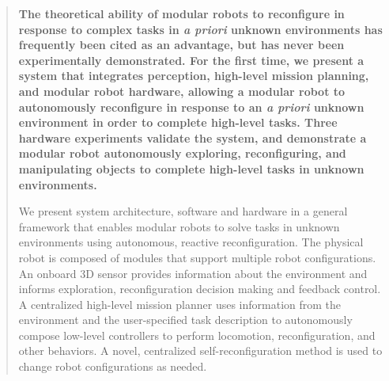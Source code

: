 \documentclass[12pt]{article}
\newenvironment{sciabstract}{%
\begin{quote} \bf}
{\end{quote}}
\begin{document}



\maketitle 


\begin{sciabstract}
%
The theoretical ability of modular robots to reconfigure in response to complex tasks in \textit{a priori} unknown environments has frequently been cited as an advantage, but has never been experimentally demonstrated.
For the first time, we present a system that integrates perception, high-level mission planning, and modular robot hardware, allowing a modular robot to autonomously reconfigure in response to an \textit{a priori} unknown environment in order to complete high-level tasks.
Three hardware experiments validate the system, and demonstrate a modular robot autonomously exploring, reconfiguring, and manipulating objects to complete high-level tasks in unknown environments.

We present system architecture, software and hardware in a general framework that enables modular robots to solve tasks in unknown environments using autonomous, reactive reconfiguration. The physical robot is composed of modules that support multiple robot configurations. An onboard 3D sensor provides information about the environment and informs exploration, reconfiguration decision making and feedback control.  A centralized high-level mission planner uses information from the environment and the user-specified task description to autonomously compose low-level controllers to perform locomotion, reconfiguration, and other behaviors. A novel, centralized self-reconfiguration method is used to change robot configurations as needed.
%
\end{sciabstract}
\end{document}
